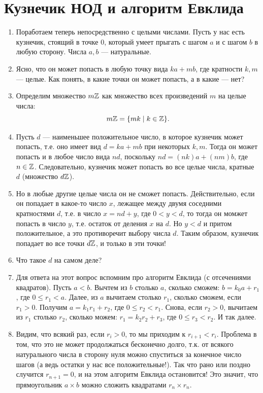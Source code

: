 \section{Кузнечик НОД и алгоритм Евклида}\label{EVKL}



\begin{enumerate}
\item Поработаем теперь непосредственно с целыми числами. Пусть у нас есть кузнечик, стоящий в точке 0, который умеет прыгать с шагом $a$ и с шагом $b$ в любую сторону. Числа $a,b$ --- натуральные.
\item Ясно, что он может попасть в любую точку вида $ka+mb$, где кратности $k,m$ --- целые. Как понять, в какие точки он может попасть, а в какие --- нет?
\item Определим множество $m\mathbb Z$ как множество всех произведений $m$ на целые числа:
$$
m\mathbb Z = \{mk\mid k\in\mathbb Z\}.
$$
\item Пусть $d$ --- наименьшее положительное число, в которое кузнечик может попасть, т.е. оно имеет вид $d=ka+mb$ при некоторых $k,m$. Тогда он может попасть и в любое число вида $nd$, поскольку $nd=(nk)a+(nm)b$, где $n\in\mathbb Z$. Следовательно, кузнечик может попасть во все целые числа, кратные $d$ (множество $d\mathbb Z$).
\item Но в любые другие целые числа он не сможет попасть. Действительно, если он попадает в какое-то число $x$, лежащее между двумя соседними кратностями $d$, т.е. в число $x=nd+y$, где $0<y<d$, то тогда он момжет попасть в число $y$, т.е. остаток от деления $x$ на $d$. Но $y<d$ и притом положительное, а это противоречит выбору числа $d$. Таким образом, кузнечик попадает во все точки $d\mathbb Z$, и только в эти точки!
\item Что такое $d$ на самом деле?
\item Для ответа на этот вопрос вспомним про алгоритм Евклида (с отсечениями квадратов). Пусть $a<b$. Вычтем из $b$ столько $a$, сколько сможем: $b=k_0a+r_1$, где $0\le r_1<a$. Далее, из $a$ вычитаем столько $r_1$, сколько сможем, если $r_1>0$. Получим $a=k_1r_1+r_2$, где $0\le r_2<r_1$. Снова, если $r_2>0$, вычитаем из $r_1$ столько $r_2$, сколько можем: $r_1=k_2r_2+r_3$, где $0\le r_3<r_2$. И так далее.
\item Видим, что всякий раз, если $r_i>0$, то мы приходим к $r_{i+1}<r_i$. Проблема в том, что это не может продолжаться бесконечно долго, т.к. от всякого натурального числа в сторону нуля можно спуститься за конечное число шагов (а ведь остатки у нас все положительные!). Так что рано или поздно случится $r_{n+1}=0$, и на этом алгоритм Евклида остановится! Это значит, что прямоугольник $a\times b$ можно сложить квадратами $r_n\times r_n$.

\end{enumerate}
